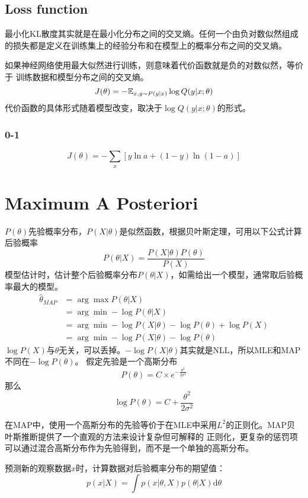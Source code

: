 \subsection{Loss function}

最小化KL散度其实就是在最小化分布之间的交叉熵。任何一个由负对数似然组成的损失都是定义在训练集上的经验分布和在模型上的概率分布之间的交叉熵。

如果神经网络使用最大似然进行训练，则意味着代价函数就是负的对数似然，等价于 训练数据和模型分布之间的交叉熵。
\[J(\theta) = - \mathbb{E} _{x,y \sim P(y|x)} \log Q(y|x; \theta)\]
代价函数的具体形式随着模型改变，取决于$\log Q(y|x; \theta)$的形式。

\subsubsection{0-1}

\[J(\theta) = -\sum_{x}[y\ln a + (1 - y)\ln (1 - a)]\]

\section{Maximum A Posteriori}
$P(\theta)$先验概率分布，$P(X|\theta)$是似然函数，根据贝叶斯定理，可用以下公式计算后验概率
\begin{equation}
    P(\theta|X) = \frac{P(X|\theta)P(\theta)}{P(X)}
\end{equation}
模型估计时，估计整个后验概率分布$P(\theta|X)$，如需给出一个模型，通常取后验概率最大的模型。
\begin{equation}
    \begin{split}
        \hat{\theta}_{MAP} &= \arg \max P(\theta | X) \\
        &= \arg \min -\log P(\theta | X) \\
        &= \arg \min -\log P(X|\theta) - \log P(\theta) + \log P(X) \\
        &= \arg \min -\log P(X|\theta) - \log P(\theta)
    \end{split}
\end{equation}
$\log P(X)$与$\theta$无关，可以丢掉。$-\log P(X|\theta)$其实就是NLL，所以MLE和MAP不同在$- \log P(\theta)$。
假定先验是一个高斯分布
\begin{equation}
    P(\theta) = C \times e^{-\frac{\theta^2}{2\sigma^2}}
\end{equation}
那么
\begin{equation}
    \log P(\theta) = C + \frac{\theta^2}{2\sigma^2}
\end{equation}

在MAP中，使用一个高斯分布的先验等价于在MLE中采用$L^2$的正则化。MAP贝叶斯推断提供了一个直观的方法来设计复杂但可解释的
正则化，更复杂的惩罚项可以通过混合高斯分布作为先验得到，而不是一个单独的高斯分布。


预测新的观察数据$x$时，计算数据对后验概率分布的期望值：
\begin{equation}
    p(x|X) = \int p(x | \theta, X)p(\theta|X)\mathrm{d}\theta
\end{equation}
